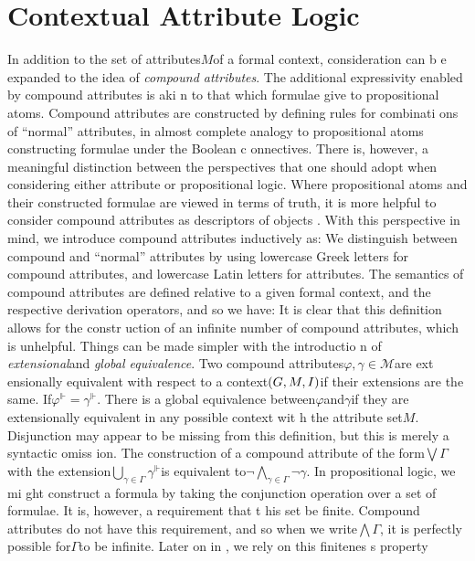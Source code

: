 \section{Contextual Attribute Logic}
\label{section:contextual-attribute-logic}In addition to the set of attributes$M$of a formal context, consideration can b
e expanded to the idea of \textit{compound attributes}. The additional expressivity enabled by compound attributes is aki
n to that which formulae give to propositional atoms. Compound attributes are constructed by defining rules for
combinati ons of ``normal'' attributes, in almost complete analogy to propositional atoms constructing formulae under the
Boolean c onnectives. There is, however, a meaningful distinction between the perspectives that one should adopt when
considering either attribute or propositional logic. Where propositional atoms and their constructed formulae are viewed
in terms of truth, it is more helpful to consider compound attributes as descriptors of objects
\cite{ganter2024formal,ganter2025language}. With this perspective in mind, we introduce compound attributes inductively
as: We distinguish between compound and ``normal'' attributes by using lowercase Greek letters for compound attributes,
and lowercase Latin letters for attributes. The semantics of compound attributes are defined relative to a given formal context,
and the respective derivation operators, and so we have: It is clear that this definition allows for the constr uction
of an infinite number of compound attributes, which is unhelpful. Things can be made simpler with the introductio n of
\textit{extensional}and \textit{global equivalence}. Two compound attributes$\varphi, \gamma \in \mathcal{M}$are ext
ensionally equivalent with respect to a context$(G,M,\mathrel{I})$if their extensions are the same. If$\varphi^{\Vdash}= \gamma^{\Vdash}$.
There is a global equivalence between$\varphi$and$\gamma$if they are extensionally equivalent in any possible context wit
h the attribute set$M$. Disjunction may appear to be missing from this definition, but this is merely a syntactic omiss
ion. The construction of a compound attribute of the form$\bigvee \Gamma$with the extension$\underset{\gamma \in \Gamma}\bigcup
\gamma^{\Vdash}$is equivalent to$\neg \underset{\gamma \in \Gamma}\bigwedge \neg \gamma$. In propositional logic, we mi
ght construct a formula by taking the conjunction operation over a set of formulae. It is, however, a requirement that t
his set be finite. Compound attributes do not have this requirement, and so when we write$\bigwedge \Gamma$, it is perfectly
possible for$\Gamma$to be infinite. Later on in , we rely on this finitenes s property
